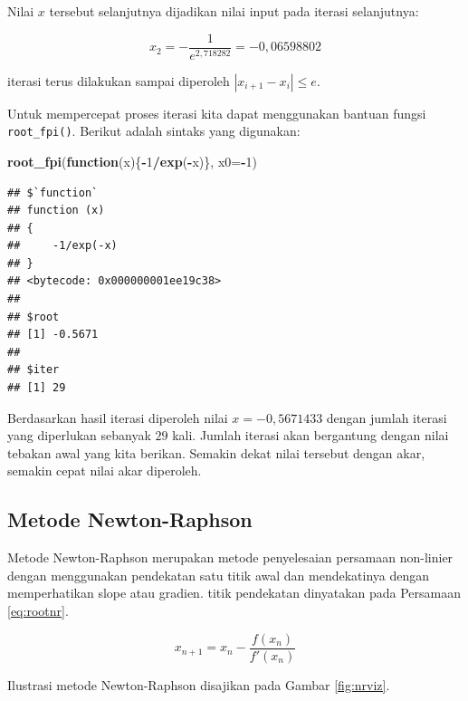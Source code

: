 \documentclass[]{book}
\newenvironment{Shaded}{\begin{snugshade}}{\end{snugshade}}
\newcommand{\ControlFlowTok}[1]{\textcolor[rgb]{0.13,0.29,0.53}{\textbf{#1}}}
\newcommand{\DataTypeTok}[1]{\textcolor[rgb]{0.13,0.29,0.53}{#1}}
\newcommand{\DecValTok}[1]{\textcolor[rgb]{0.00,0.00,0.81}{#1}}
\newcommand{\KeywordTok}[1]{\textcolor[rgb]{0.13,0.29,0.53}{\textbf{#1}}}
\newcommand{\NormalTok}[1]{#1}
\newcommand{\OperatorTok}[1]{\textcolor[rgb]{0.81,0.36,0.00}{\textbf{#1}}}
\theoremstyle{definition}
\theoremstyle{definition}
\theoremstyle{definition}
\theoremstyle{remark}
\begin{document}
Nilai \(x\) tersebut selanjutnya dijadikan nilai input pada iterasi selanjutnya:

\[
x_2 = -\frac{1}{e^{2,718282}}=-0,06598802
\]

iterasi terus dilakukan sampai diperoleh \(\left| x_{i+1}-x_i \right|\le e\).

Untuk mempercepat proses iterasi kita dapat menggunakan bantuan fungsi \texttt{root\_fpi()}. Berikut adalah sintaks yang digunakan:

\begin{Shaded}
\begin{Highlighting}[]
\KeywordTok{root_fpi}\NormalTok{(}\ControlFlowTok{function}\NormalTok{(x)\{}\OperatorTok{-}\DecValTok{1}\OperatorTok{/}\KeywordTok{exp}\NormalTok{(}\OperatorTok{-}\NormalTok{x)\}, }\DataTypeTok{x0=}\OperatorTok{-}\DecValTok{1}\NormalTok{)}
\end{Highlighting}
\end{Shaded}

\begin{verbatim}
## $`function`
## function (x) 
## {
##     -1/exp(-x)
## }
## <bytecode: 0x000000001ee19c38>
## 
## $root
## [1] -0.5671
## 
## $iter
## [1] 29
\end{verbatim}

Berdasarkan hasil iterasi diperoleh nilai \(x=-0,5671433\) dengan jumlah iterasi yang diperlukan sebanyak \(29\) kali. Jumlah iterasi akan bergantung dengan nilai tebakan awal yang kita berikan. Semakin dekat nilai tersebut dengan akar, semakin cepat nilai akar diperoleh.

\hypertarget{newtonraphson}{%
\subsection{Metode Newton-Raphson}\label{newtonraphson}}

Metode Newton-Raphson merupakan metode penyelesaian persamaan non-linier dengan menggunakan pendekatan satu titik awal dan mendekatinya dengan memperhatikan slope atau gradien. titik pendekatan dinyatakan pada Persamaan \eqref{eq:rootnr}.

\begin{equation}
x_{n+1}=x_n-\frac{f\left(x_n\right)}{f'\left(x_n\right)}
  \label{eq:rootnr}
\end{equation}

Ilustrasi metode Newton-Raphson disajikan pada Gambar \ref{fig:nrviz}.
\end{document}
